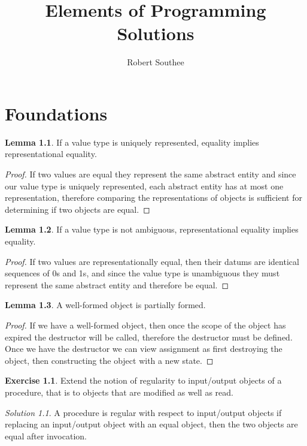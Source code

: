 \documentclass{report}
\title{Elements of Programming Solutions}
\author{Robert Southee}
\date{}
\theoremstyle{definition}
\newtheorem{lemma}{Lemma}[chapter]
\newtheorem{exercise}{Exercise}[chapter]
\theoremstyle{remark}
\newtheorem*{solution}{Solution}
\begin{document}
\maketitle

\chapter{Foundations}

\begin{lemma}
	If a value type is uniquely represented, equality implies
	representational equality.
\end{lemma}

\begin{proof}
	If two values are equal they represent the same abstract entity and
	since our value type is uniquely represented, each abstract entity
	has at most one representation, therefore comparing the
	representations of objects is sufficient for determining if two
	objects are equal.
\end{proof}

\begin{lemma}
	If a value type is not ambiguous, representational equality implies
	equality.
\end{lemma}

\begin{proof}
	If two values are representationally equal, then their datums are
	identical sequences of 0s and 1s, and since the value type is
	unambiguous they must represent the same abstract entity and therefore
	be equal.
\end{proof}

\begin{lemma}
	A well-formed object is partially formed.
\end{lemma}

\begin{proof}
	If we have a well-formed object, then once the scope of the object
	has expired the destructor will be called, therefore the destructor
	must be defined. Once we have the destructor we can view assignment
	as first destroying the object, then constructing the object with a new
	state.
\end{proof}

\begin{exercise}
	Extend the notion of regularity to input/output objects of a procedure,
	that is to objects that are modified as well as read.
\end{exercise}

\begin{solution}
	A procedure is regular with respect to input/output objects if
	replacing an input/output object with an equal object, then the two
	objects are equal after invocation.
\end{solution}
\end{document}
